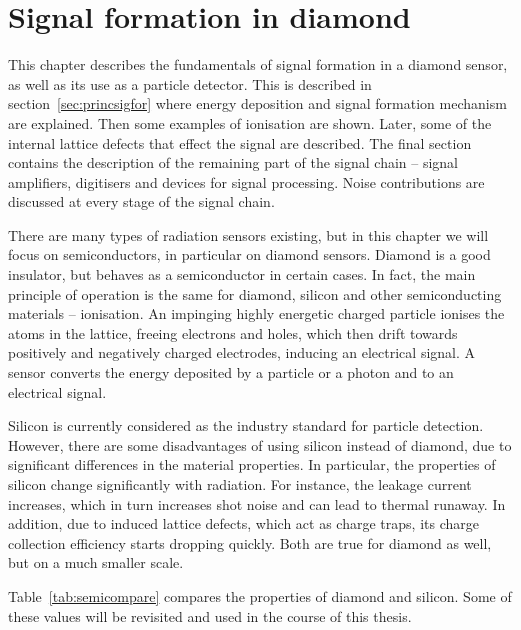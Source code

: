 \documentclass[12pt]{mytustyle}  %
\begin{document}
\baselineskip=15pt
\newcommand{\ga}{\greektext a\latintext}
\newcommand{\gmu}{\greektext m\latintext}

\chapter{Signal formation in diamond}

This chapter describes the fundamentals of signal formation in a diamond sensor, as well as its use as a particle detector. This is described in section~\ref{sec:princsigfor} where energy deposition and signal formation mechanism are explained. Then some examples of ionisation are shown. Later, some of the internal lattice defects that effect the signal are described. The final section contains the description of the remaining part of the signal chain -- signal amplifiers, digitisers and devices for signal processing. Noise contributions are discussed at every stage of the signal chain.

There are many types of radiation sensors existing, but in this chapter we will focus on semiconductors, in particular on diamond sensors. Diamond is a good insulator, but behaves as a semiconductor in certain cases.  In fact, the main principle of operation is the same for diamond, silicon and other semiconducting materials -- ionisation.  An impinging highly energetic charged particle ionises the atoms in the lattice, freeing electrons and holes, which then drift towards positively and negatively charged electrodes, inducing an electrical signal. A sensor converts the energy deposited by a particle or a photon and to an electrical signal.

Silicon is currently considered as the industry standard for particle detection. However, there are some disadvantages of using silicon instead of diamond, due to significant differences in the material properties. In particular, the properties of silicon change significantly with radiation. For instance, the leakage current increases, which in turn increases shot noise and can lead to thermal runaway. In addition, due to induced lattice defects, which act as charge traps, its charge collection efficiency starts dropping quickly. Both are true for diamond as well, but on a much smaller scale.

Table~\ref{tab:semicompare} compares the properties of diamond and silicon. Some of these values will be revisited and used in the course of this thesis.
\end{document}
